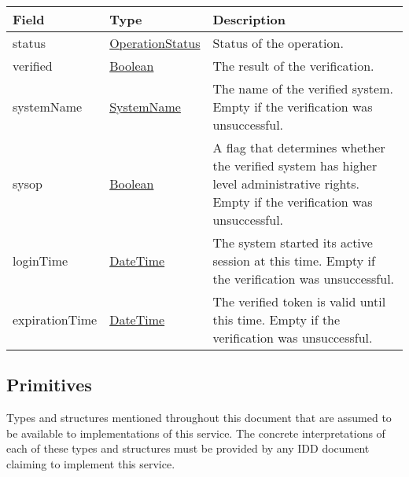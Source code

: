 \documentclass[a4paper]{arrowhead}
\newcommand{\pref}[1]{{\textcolor{ArrowheadGrey}{\hyperref[sec:model:primitives:#1]{#1}}}}
\begin{document}
 
\begin{table}[ht!]
\begin{tabularx}{\textwidth}{| p{4.25cm} | p{4cm} | X |} \hline
\rowcolor{gray!33} Field & Type      & Description \\ \hline
status & \pref{OperationStatus} & Status of the operation. \\ \hline
verified & \pref{Boolean} & The result of the verification. \\ \hline
systemName & \pref{SystemName} & The name of the verified system. Empty if the verification was unsuccessful. \\ \hline
sysop & \pref{Boolean} & A flag that determines whether the verified system has higher level administrative rights. Empty if the verification was unsuccessful. \\ \hline
loginTime & \pref{DateTime} & The system started its active session at this time. Empty if the verification was unsuccessful. \\ \hline
expirationTime & \pref{DateTime} & The verified token is valid until this time. Empty if the verification was unsuccessful. \\ \hline
\end{tabularx}
\end{table}

\subsection{Primitives}
\label{sec:model:primitives}

Types and structures mentioned throughout this document that are assumed to be available to implementations of this service.
The concrete interpretations of each of these types and structures must be provided by any IDD document claiming to implement this service.
\end{document}
